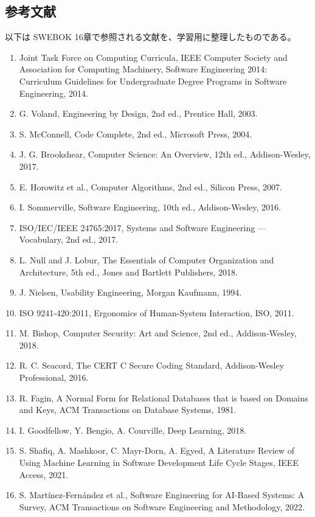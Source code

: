 \documentclass[a4paper,11pt]{ltjsarticle}
\numberwithin{figure}{section}
\numberwithin{table}{section}
\begin{document}
\subsection{参考文献}

以下は SWEBOK 16章で参照される文献を、学習用に整理したものである。

\begin{enumerate}[leftmargin=2em]
\item Joint Task Force on Computing Curricula, IEEE Computer Society and Association for Computing Machinery, Software Engineering 2014: Curriculum Guidelines for Undergraduate Degree Programs in Software Engineering, 2014.
\item G. Voland, Engineering by Design, 2nd ed., Prentice Hall, 2003.
\item S. McConnell, Code Complete, 2nd ed., Microsoft Press, 2004.
\item J. G. Brookshear, Computer Science: An Overview, 12th ed., Addison-Wesley, 2017.
\item E. Horowitz et al., Computer Algorithms, 2nd ed., Silicon Press, 2007.
\item I. Sommerville, Software Engineering, 10th ed., Addison-Wesley, 2016.
\item ISO/IEC/IEEE 24765:2017, Systems and Software Engineering — Vocabulary, 2nd ed., 2017.
\item L. Null and J. Lobur, The Essentials of Computer Organization and Architecture, 5th ed., Jones and Bartlett Publishers, 2018.
\item J. Nielsen, Usability Engineering, Morgan Kaufmann, 1994.
\item ISO 9241-420:2011, Ergonomics of Human-System Interaction, ISO, 2011.
\item M. Bishop, Computer Security: Art and Science, 2nd ed., Addison-Wesley, 2018.
\item R. C. Seacord, The CERT C Secure Coding Standard, Addison-Wesley Professional, 2016.
\item R. Fagin, A Normal Form for Relational Databases that is based on Domains and Keys, ACM Transactions on Database Systems, 1981.
\item I. Goodfellow, Y. Bengio, A. Courville, Deep Learning, 2018.
\item S. Shafiq, A. Mashkoor, C. Mayr-Dorn, A. Egyed, A Literature Review of Using Machine Learning in Software Development Life Cycle Stages, IEEE Access, 2021.
\item S. Martínez-Fernández et al., Software Engineering for AI-Based Systems: A Survey, ACM Transactions on Software Engineering and Methodology, 2022.

\end{enumerate}
\end{document}
